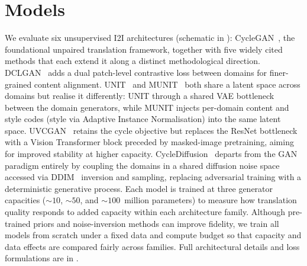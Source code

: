 
\section{Models}
\label{sec:models}

We evaluate six unsupervised I2I architectures (schematic in ):
CycleGAN~\cite{zhu2017unpaired}, the foundational unpaired translation framework,
together with five widely cited methods that each extend it along a distinct
methodological direction.
DCLGAN~\cite{han2021dual} adds a dual patch-level contrastive loss between domains for
finer-grained content alignment.
UNIT~\cite{liu2017unsupervised} and MUNIT~\cite{huang2018multimodal} both share a latent
space across domains but realise it differently: UNIT through a shared VAE bottleneck between
the domain generators, while MUNIT injects per-domain content and style codes (style via
Adaptive Instance Normalisation) into the same latent space.
UVCGAN~\cite{torbunov2022uvcgan} retains the cycle objective but replaces the ResNet
bottleneck with a Vision Transformer block preceded by masked-image pretraining, aiming
for improved stability at higher capacity.
CycleDiffusion~\cite{wu2022cyclediffusion} departs from the GAN paradigm entirely by
coupling the domains in a shared diffusion noise space accessed via DDIM~\cite{song2021ddim}
inversion and sampling, replacing adversarial training with a deterministic generative
process.
Each model is trained at three generator capacities (${\sim}10$, ${\sim}50$, and
${\sim}100$~million parameters) to measure how translation quality responds to added
capacity within each architecture family.
Although pre-trained priors and noise-inversion methods can improve fidelity, we train
all models from scratch under a fixed data and compute budget so that capacity and data
effects are compared fairly across families.
Full architectural details and loss formulations are in .

